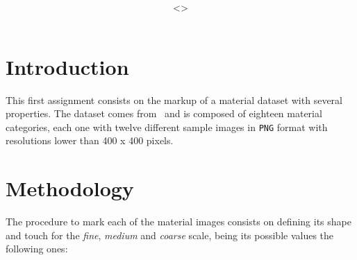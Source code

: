 \documentclass[12pt,a4paper]{article}
\title{\vspace{2in}\textmd{\hmwkClass\\\textbf{\hmwkTitle}}\\\normalsize\vspace{0.1in}\small{\hmwkDueDate}\\\vspace{4in}}
\date{}
\author{\textbf{\hmwkAuthorNameA} \\<\texttt{\href{mailto:ruizcep2@illinois.edu}{\hmwkAuthorEmailA}}>}
\begin{document}
\begin{singlespace}

\begin{titlepage}
\maketitle
\thispagestyle{empty}
\end{titlepage}

\hypertarget{toc}{}
\tableofcontents
\newpage



\clearpage

\newcommand{\e}[1]{\emph{#1}\xspace}

\section{Introduction}
This first assignment consists on the markup of a material dataset with several properties. The dataset comes from~\cite{Liao_2013_CVPR} and is composed of eighteen material categories, each one with twelve different sample images in \texttt{PNG} format with resolutions lower than 400 x 400 pixels.

\section{Methodology}
The procedure to mark each of the material images consists on defining its shape and touch for the \e{fine}, \e{medium} and \e{coarse} scale, being its possible values the following ones:

\newcommand{\Fine}{\textbf{Fine}}
\newcommand{\Medium}{\textbf{Medium}}
\newcommand{\Coarse}{\textbf{Coarse}}

\newcommand{\sfl}{\e{flat}}
\newcommand{\sro}{\e{round}}
\newcommand{\sexor}{\e{extended organized}}
\newcommand{\sexdi}{\e{extended disorganized}}

\newcommand{\tfu}{\e{furry}} 
\newcommand{\tfe}{\e{feathery}} 
\newcommand{\tco}{\e{coarse}} 
\newcommand{\tro}{\e{rough}} 
\newcommand{\tbu}{\e{bumpy}} 
\newcommand{\tsc}{\e{scratchy}} 
\newcommand{\tsm}{\e{smooth}} 
\newcommand{\tve}{\e{velvety}}


\end{singlespace}
\end{document}
